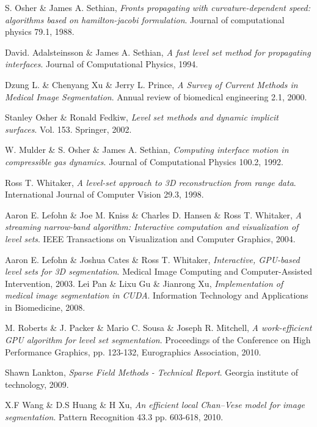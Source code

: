 \begin{thebibliography}{99}

	S. Osher \& James A. Sethian,
	\emph{Fronts propagating with curvature-dependent speed: algorithms based on hamilton-jacobi formulation}.
	Journal of computational physics 79.1,
	1988.
	
	David. Adalsteinsson \& James A. Sethian,
	\emph{A fast level set method for propagating interfaces}.
	Journal of Computational Physics,
	1994.

	Dzung L. \& Chenyang Xu \& Jerry L. Prince, 
	\emph{A Survey of Current Methods in Medical Image Segmentation}.
	Annual review of biomedical engineering 2.1,
	2000.

	Stanley Osher \& Ronald Fedkiw,
	\emph{Level set methods and dynamic implicit surfaces}.
	Vol. 153. Springer,
	2002.

	W. Mulder \& S. Osher \& James A. Sethian,
	\emph{Computing interface motion in compressible gas dynamics}.
	Journal of Computational Physics 100.2,
	1992.

	Ross T. Whitaker,
	\emph{A level-set approach to 3D reconstruction from range data}.
	International Journal of Computer Vision 29.3,
	1998.

	Aaron E. Lefohn \& Joe M. Kniss \& Charles D. Hansen \& Ross T. Whitaker,
	\emph{A streaming narrow-band algorithm: Interactive computation and visualization of level sets}.
	IEEE Transactions on Visualization and Computer Graphics,
	2004.

	Aaron E. Lefohn \& Joshua Cates \& Ross T. Whitaker,
	\emph{Interactive, GPU-based level sets for 3D segmentation}.
	 Medical Image Computing and Computer-Assisted Intervention,
	2003.
	Lei Pan \& Lixu Gu \& Jianrong Xu,
	\emph{Implementation of medical image segmentation in CUDA}.
	Information Technology and Applications in Biomedicine,
	2008.

	M. Roberts \& J. Packer \& Mario C. Sousa \& Joseph R. Mitchell,
	\emph{A work-efficient GPU algorithm for level set segmentation}.
	Proceedings of the Conference on High Performance Graphics, pp. 123-132, Eurographics Association,
	2010.

	Shawn Lankton,
	\emph{Sparse Field Methods - Technical Report}.
	Georgia institute of technology,
	2009.

	X.F Wang \& D.S Huang \& H Xu,
	\emph{An efficient local Chan–Vese model for image segmentation}.
	Pattern Recognition 43.3 pp. 603-618,
	2010.
	

\end{thebibliography}
